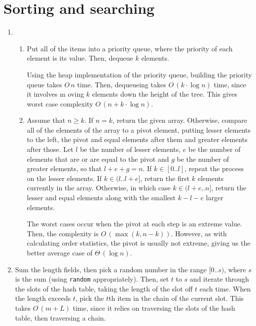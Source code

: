 \documentclass[11pt]{article}
\begin{document}
\section{Sorting and searching}
\begin{enumerate}
\item
  \begin{enumerate}
  \item
    Put all of the items into a priority queue, where the priority of each element is its value. Then, dequeue \(k\) elements.

    Using the heap implementation of the priority queue, building the priority queue takes \(O\,n\) time. Then, dequeueing takes \(O\,\left( k\cdot\log n \right)\) time, since it involves m oving \(k\) elements down the height of the tree. This gives worst case complexity \(O\,\left( n+k\cdot\log n \right)\).
  \item
    Assume that \(n\geq k\). If \(n=k\), return the given array. Otherwise, compare all of the elements of the array to a pivot element, putting lesser elements to the left, the pivot and equal elements after them and greater elements after those. Let \(l\) be the number of lesser elements, \(e\) be the number of elements that are or are equal to the pivot and \(g\) be the number of greater elements, so that \(l+e+g=n\). If \(k\in[0..l]\), repeat the process on the lesser elements. If \(k\in(l..l+e]\), return the first \(k\) elements currently in the array. Otherwise, in which case \(k\in(l+e..n]\), return the lesser and equal elements along with the smallest \(k-l-e\) larger elements.

    The worst cases occur when the pivot at each step is an extreme value. Then, the complexity is \(O\,\left( \max(k,n-k) \right)\). However, as with calculating order statistics, the pivot is usually not extreme, giving us the better average case of \(\Theta\,\left( \log n \right)\).
  \end{enumerate}
\item
  Sum the length fields, then pick a random number in the range \([0..s)\), where \(s\) is the sum (using \texttt{random} appropriately). Then, set \(t\) to \(s\) and iterate through the slots of the hash table, taking the length of the slot off \(t\) each time. When the length exceeds \(t\), pick the \(t\)th item in the chain of the current slot. This takes \(O\,\left( m+L \right)\) time, since it relies on traversing the slots of the hash table, then traversing a chain.
\end{enumerate}
\end{document}
